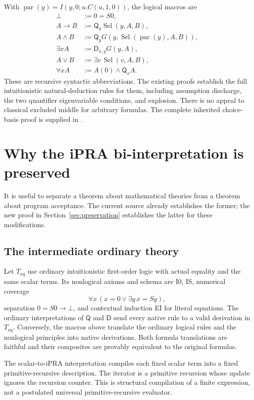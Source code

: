 \documentclass[11pt]{article}
\theoremstyle{definition}\newtheorem{definition}[theorem]{Definition}
\theoremstyle{remark}\newtheorem{remark}[theorem]{Remark}
\newcommand{\Teq}{T_{\mathrm{eq}}}
\newcommand{\Q}{\mathsf Q}
\newcommand{\D}{\mathsf D}
\begin{document}
With $\operatorname{par}(y)=I(y,0;u.C(u,1,0))$, the logical macros are
\begin{align*}
 \bot&:=0=S0,\\
 A\to B&:=\Q_y\operatorname{Sel}(y,A,B),\\
 A\land B&:=\Q_yG(y,\operatorname{Sel}(\operatorname{par}(y),A,B)),\\
 \exists x A&:=\D_{x,y}G(y,A),\\
 A\lor B&:=\exists v\,\operatorname{Sel}(v,A,B),\\
 \forall x A&:=A(0)\land\Q_xA.
\end{align*}
These are recursive syntactic abbreviations. The existing proofs establish
the full intuitionistic natural-deduction rules for them, including
assumption discharge, the two quantifier eigenvariable conditions, and
explosion. There is no appeal to classical excluded middle for arbitrary
formulas. The complete inherited choice-basis proof is supplied in
.

\section{Why the iPRA bi-interpretation is preserved}
\label{sec:bridge}

It is useful to separate a theorem about mathematical theories from a
theorem about program acceptance. The current source already establishes
the former; the new proof in Section~\ref{sec:preservation} establishes
the latter for these modifications.

\subsection{The intermediate ordinary theory}

Let $\Teq$ use ordinary intuitionistic first-order logic with actual
equality and the same scalar terms. Its nonlogical axioms and schema are
I0, IS, numerical coverage
\[
 \forall x\,(x=0\lor\exists y\,x=Sy),
\]
separation $0=S0\to\bot$, and contextual induction EI for literal
equations. The ordinary interpretations of $\Q$ and $\D$ send every
native rule to a valid derivation in $\Teq$. Conversely, the macros above
translate the ordinary logical rules and the nonlogical principles into
native derivations. Both formula translations are faithful and their
composites are provably equivalent to the original formulas.

The scalar-to-iPRA interpretation compiles each fixed scalar term into
a fixed primitive-recursive description. The iterator is a primitive
recursion whose update ignores the recursion counter. This is structural
compilation of a finite expression, not a postulated universal
primitive-recursive evaluator.
\end{document}
